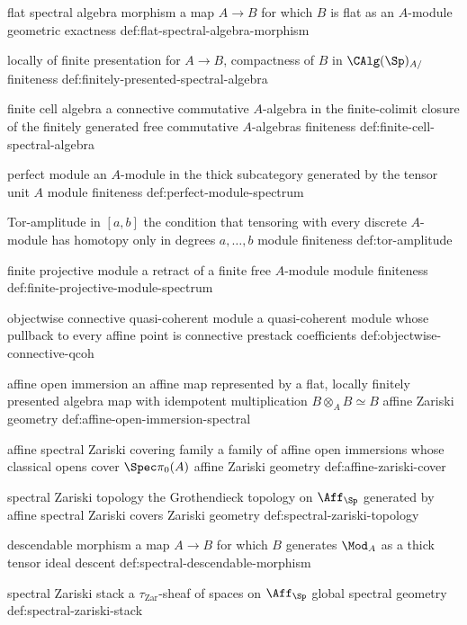 \begin{longtable}
\CanonicalTerm
{flat spectral algebra morphism}
{a map \(A\to B\) for which \(B\) is flat as an \(A\)-module}
{geometric exactness}
{def:flat-spectral-algebra-morphism}

\CanonicalTerm
{locally of finite presentation}
{for \(A\to B\), compactness of \(B\) in \(\CAlg(\Sp)_{A/}\)}
{finiteness}
{def:finitely-presented-spectral-algebra}

\CanonicalTerm
{finite cell algebra}
{a connective commutative \(A\)-algebra in the finite-colimit closure of the finitely generated free commutative \(A\)-algebras}
{finiteness}
{def:finite-cell-spectral-algebra}

\CanonicalTerm
{perfect module}
{an \(A\)-module in the thick subcategory generated by the tensor unit \(A\)}
{module finiteness}
{def:perfect-module-spectrum}

\CanonicalTerm
{Tor-amplitude in \([a,b]\)}
{the condition that tensoring with every discrete \(A\)-module has homotopy only in degrees \(a,\ldots,b\)}
{module finiteness}
{def:tor-amplitude}

\CanonicalTerm
{finite projective module}
{a retract of a finite free \(A\)-module}
{module finiteness}
{def:finite-projective-module-spectrum}

\CanonicalTerm
{objectwise connective quasi-coherent module}
{a quasi-coherent module whose pullback to every affine point is connective}
{prestack coefficients}
{def:objectwise-connective-qcoh}

\CanonicalTerm
{affine open immersion}
{an affine map represented by a flat, locally finitely presented algebra map with idempotent multiplication \(B\otimes_A B\simeq B\)}
{affine Zariski geometry}
{def:affine-open-immersion-spectral}

\CanonicalTerm
{affine spectral Zariski covering family}
{a family of affine open immersions whose classical opens cover \(\Spec\pi_0(A)\)}
{affine Zariski geometry}
{def:affine-zariski-cover}

\CanonicalTerm
{spectral Zariski topology}
{the Grothendieck topology on \(\Aff_{\Sp}\) generated by affine spectral Zariski covers}
{Zariski geometry}
{def:spectral-zariski-topology}

\CanonicalTerm
{descendable morphism}
{a map \(A\to B\) for which \(B\) generates \(\Mod_A\) as a thick tensor ideal}
{descent}
{def:spectral-descendable-morphism}

\CanonicalTerm
{spectral Zariski stack}
{a \(\tau_{\mathrm{Zar}}\)-sheaf of spaces on \(\Aff_{\Sp}\)}
{global spectral geometry}
{def:spectral-zariski-stack}


\end{longtable}
